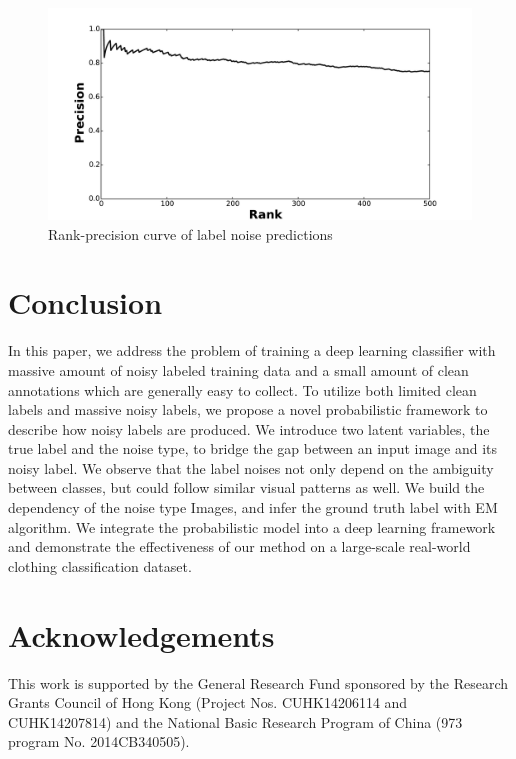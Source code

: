 \documentclass[10pt,twocolumn,letterpaper]{article}
\begin{document}
\begin{figure}[t]
\begin{center}
\includegraphics[width=1.0\linewidth]{figure/noise_prediction_rank_precision.pdf}
\end{center}
\caption{Rank-precision curve of label noise predictions}
\label{fig:noise_prediction_rp}
\end{figure}

\section{Conclusion} %
\label{sec:conclusion}
In this paper, we address the problem of training a deep learning classifier with massive amount of noisy labeled training data and a small amount of clean annotations which are generally easy to collect. To utilize both limited clean labels and massive noisy labels, we propose a novel probabilistic framework to describe how noisy labels are produced. We introduce two latent variables, the true label and the noise type, to bridge the gap between an input image and its noisy label. We observe that the label noises not only depend on the ambiguity between classes, but could follow similar visual patterns as well. We build the dependency of the noise type \wrt Images, and infer the ground truth label with EM algorithm. We integrate the probabilistic model into a deep learning framework and demonstrate the effectiveness of our method on a large-scale real-world clothing classification dataset.

\section*{Acknowledgements}
\label{sec:acknowledgements}
This work is supported by the General Research Fund sponsored by the Research Grants Council of Hong Kong (Project Nos. CUHK14206114 and CUHK14207814) and the National Basic Research Program of China (973 program No. 2014CB340505).


{\small


}
\end{document}
